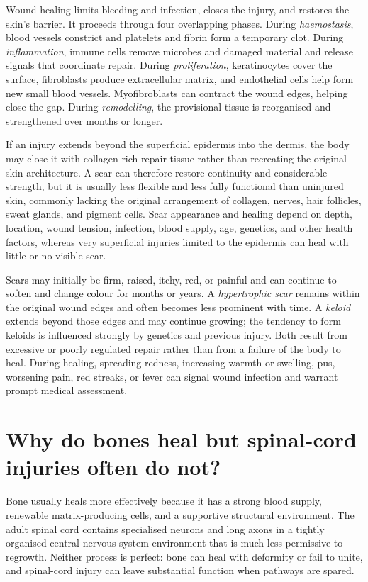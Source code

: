 \documentclass[11pt,oneside]{report}
\begin{document}
Wound healing limits bleeding and infection, closes the injury, and restores
the skin's barrier. It proceeds through four overlapping phases. During
\emph{haemostasis}, blood vessels constrict and platelets and fibrin form a
temporary clot. During \emph{inflammation}, immune cells remove microbes and
damaged material and release signals that coordinate repair. During
\emph{proliferation}, keratinocytes cover the surface, fibroblasts produce
extracellular matrix, and endothelial cells help form new small blood vessels.
Myofibroblasts can contract the wound edges, helping close the gap. During
\emph{remodelling}, the provisional tissue is reorganised and strengthened over
months or longer.

If an injury extends beyond the superficial epidermis into the dermis, the body
may close it with collagen-rich repair tissue rather than recreating the
original skin architecture. A scar can therefore restore continuity and
considerable strength, but it is usually less flexible and less fully functional
than uninjured skin, commonly lacking the original arrangement of collagen,
nerves, hair follicles, sweat glands, and pigment cells. Scar appearance and
healing depend on depth, location, wound tension, infection, blood supply, age,
genetics, and other health factors, whereas very superficial injuries limited to
the epidermis can heal with little or no visible scar.

Scars may initially be firm, raised, itchy, red, or painful and can continue to
soften and change colour for months or years. A \emph{hypertrophic scar} remains
within the original wound edges and often becomes less prominent with time. A
\emph{keloid} extends beyond those edges and may continue growing; the tendency
to form keloids is influenced strongly by genetics and previous injury. Both
result from excessive or poorly regulated repair rather than from a failure of
the body to heal. During healing, spreading redness, increasing warmth or
swelling, pus, worsening pain, red streaks, or fever can signal wound infection
and warrant prompt medical assessment.

\section{Why do bones heal but spinal-cord injuries often do not?}

Bone usually heals more effectively because it has a strong blood supply,
renewable matrix-producing cells, and a supportive structural environment. The
adult spinal cord contains specialised neurons and long axons in a tightly
organised central-nervous-system environment that is much less permissive to
regrowth. Neither process is perfect: bone can heal with deformity or fail to
unite, and spinal-cord injury can leave substantial function when pathways are
spared.
\end{document}
